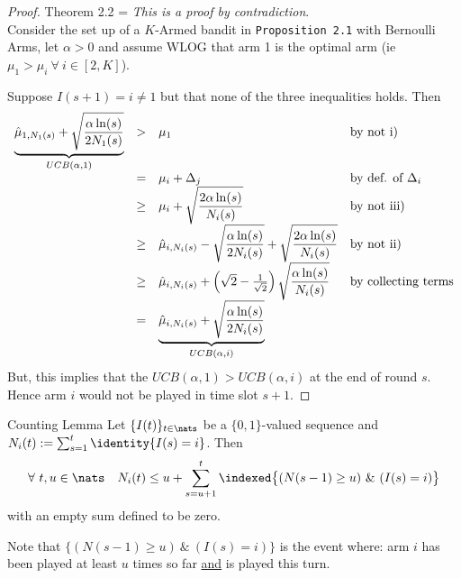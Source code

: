 \documentclass[11pt,a4paper]{article}
\begin{document}
  \begin{proof}{Theorem 2.2}
    \everymath={\displaystyle}
    \textit{This is a proof by contradiction}.\\
    Consider the set up of a $K$-Armed bandit in \texttt{Proposition 2.1} with Bernoulli Arms, let $\alpha>0$ and assume WLOG that arm 1 is the optimal arm (ie $\mu_1>\mu_i\ \forall\ i\in[2,K]$).
    \par Suppose $I(s+1)=i\neq1$ but that none of the three inequalities holds. Then
    \[\begin{array}{rcll}
      \underbrace{\hat\mu_{1,N_1(s)}+\displaystyle\sqrt{\frac{\alpha\ln(s)}{2N_1(s)}}}_{\tiny{UCB(\alpha,1)}}&>&\mu_1&\text{by not i)}\\
      &=&\mu_i+\Delta_j&\text{by def. of $\Delta_i$}\\
      &\geq&\mu_i+\displaystyle\sqrt{\frac{2\alpha\ln(s)}{N_i(s)}}&\text{by not iii)}\\
      &\geq&\hat\mu_{i,N_i(s)}-\displaystyle\sqrt{\frac{\alpha\ln(s)}{2N_i(s)}}+\sqrt{\frac{2\alpha\ln(s)}{N_i(s)}}&\text{by not ii)}\\
      &\geq&\hat\mu_{i,N_i(s)}+\left(\sqrt2-\frac1{\sqrt2}\right)\sqrt{\dfrac{\alpha\ln(s)}{N_i(s)}}&\text{by collecting terms}\\
      &=&\underbrace{\hat\mu_{i,N_i(s)}+\sqrt{\frac{\alpha\ln(s)}{2N_i(s)}}}_{\tiny{UCB(\alpha,i)}}
    \end{array}\]
    But, this implies that the $UCB(\alpha,1)>UCB(\alpha,i)$ at the end of round $s$. Hence arm $i$ would not be played in time slot $s+1$.\proved
  \end{proof}

  \begin{theorem}{Counting Lemma}
    Let $\{I(t)\}_{t\in\nats}$ be a $\{0,1\}$-valued sequence and $N_i(t):=\sum_{s=1}^t\identity{I(s)=i}$. Then
    \[ \forall\ t,u\in\nats\quad N_i(t)\leq u+\sum_{s=u+1}^t\indexed\big\{(N(s-1)\geq u)\ \&\ (I(s)=i)\big\} \]
    with an empty sum defined to be zero.
    \par Note that $\big\{(N(s-1)\geq u)\ \&\ (I(s)=i)\big\}$ is the event where: arm $i$ has been played at least $u$ times so far \underline{and} is played this turn.
  \end{theorem}
\end{document}
